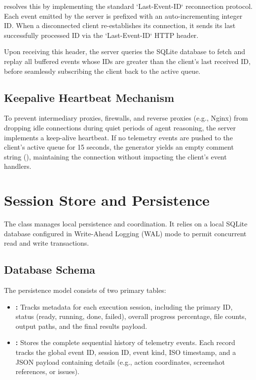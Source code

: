 \versimux{} resolves this by implementing the standard `Last-Event-ID` reconnection protocol. Each event emitted by the server is prefixed with an auto-incrementing integer ID. When a disconnected client re-establishes its connection, it sends its last successfully processed ID via the `Last-Event-ID` HTTP header. 

Upon receiving this header, the server queries the SQLite database to fetch and replay all buffered events whose IDs are greater than the client's last received ID, before seamlessly subscribing the client back to the active queue.

\subsection{Keepalive Heartbeat Mechanism}
\label{sec:keepalive}

To prevent intermediary proxies, firewalls, and reverse proxies (e.g., Nginx) from dropping idle connections during quiet periods of agent reasoning, the server implements a keep-alive heartbeat. If no telemetry events are pushed to the client's active queue for 15 seconds, the generator yields an empty comment string (), maintaining the connection without impacting the client's event handlers.


\section{Session Store and Persistence}
\label{sec:session-store}

The  class manages local persistence and coordination. It relies on a local SQLite database configured in Write-Ahead Logging (WAL) mode to permit concurrent read and write transactions.

\subsection{Database Schema}
\label{sec:db-schema}

The persistence model consists of two primary tables:
\begin{itemize}
    \item \textbf{:} Tracks metadata for each execution session, including the primary ID, status (ready, running, done, failed), overall progress percentage, file counts, output paths, and the final results payload.
    \item \textbf{:} Stores the complete sequential history of telemetry events. Each record tracks the global event ID, session ID, event kind, ISO timestamp, and a JSON payload containing details (e.g., action coordinates, screenshot references, or issues).
\end{itemize}

